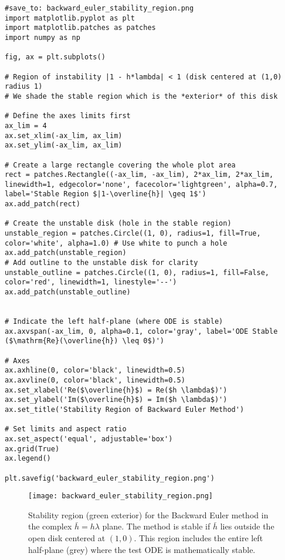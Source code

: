 \documentclass{article}
\begin{document}
\begin{verbatim}
#save_to: backward_euler_stability_region.png
import matplotlib.pyplot as plt
import matplotlib.patches as patches
import numpy as np

fig, ax = plt.subplots()

# Region of instability |1 - h*lambda| < 1 (disk centered at (1,0) radius 1)
# We shade the stable region which is the *exterior* of this disk

# Define the axes limits first
ax_lim = 4
ax.set_xlim(-ax_lim, ax_lim)
ax.set_ylim(-ax_lim, ax_lim)

# Create a large rectangle covering the whole plot area
rect = patches.Rectangle((-ax_lim, -ax_lim), 2*ax_lim, 2*ax_lim, linewidth=1, edgecolor='none', facecolor='lightgreen', alpha=0.7, label='Stable Region $|1-\overline{h}| \geq 1$')
ax.add_patch(rect)

# Create the unstable disk (hole in the stable region)
unstable_region = patches.Circle((1, 0), radius=1, fill=True, color='white', alpha=1.0) # Use white to punch a hole
ax.add_patch(unstable_region)
# Add outline to the unstable disk for clarity
unstable_outline = patches.Circle((1, 0), radius=1, fill=False, color='red', linewidth=1, linestyle='--')
ax.add_patch(unstable_outline)


# Indicate the left half-plane (where ODE is stable)
ax.axvspan(-ax_lim, 0, alpha=0.1, color='gray', label='ODE Stable ($\mathrm{Re}(\overline{h}) \leq 0$)')

# Axes
ax.axhline(0, color='black', linewidth=0.5)
ax.axvline(0, color='black', linewidth=0.5)
ax.set_xlabel('Re($\overline{h}$) = Re($h \lambda$)')
ax.set_ylabel('Im($\overline{h}$) = Im($h \lambda$)')
ax.set_title('Stability Region of Backward Euler Method')

# Set limits and aspect ratio
ax.set_aspect('equal', adjustable='box')
ax.grid(True)
ax.legend()

plt.savefig('backward_euler_stability_region.png')
\end{verbatim}

\begin{figure}[h]
    \centering
    \texttt{[image: backward\_euler\_stability\_region.png]}
    \caption{Stability region (green exterior) for the Backward Euler method in the complex $\bar{h} = h\lambda$ plane. The method is stable if $\bar{h}$ lies outside the open disk centered at $(1, 0)$. This region includes the entire left half-plane (grey) where the test ODE is mathematically stable.}
    \label{fig:backward_euler_stability}
\end{figure}
\end{document}
